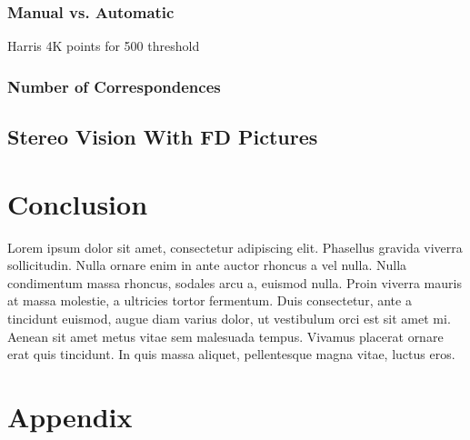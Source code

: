 \documentclass[a4paper, 10pt, conference]{ieeeconf}
\begin{document}
\subsubsection{Manual vs. Automatic}
Harris 4K points for 500 threshold
\subsubsection{Number of Correspondences}

\subsection{Stereo Vision With FD Pictures}


\cite{notes}


\section{Conclusion}
Lorem ipsum dolor sit amet, consectetur adipiscing elit. Phasellus gravida viverra sollicitudin. Nulla ornare enim in ante auctor rhoncus a vel nulla. Nulla condimentum massa rhoncus, sodales arcu a, euismod nulla. Proin viverra mauris at massa molestie, a ultricies tortor fermentum. Duis consectetur, ante a tincidunt euismod, augue diam varius dolor, ut vestibulum orci est sit amet mi. Aenean sit amet metus vitae sem malesuada tempus. Vivamus placerat ornare erat quis tincidunt. In quis massa aliquet, pellentesque magna vitae, luctus eros.




\onecolumn
\section*{Appendix}

% 
\end{document}
